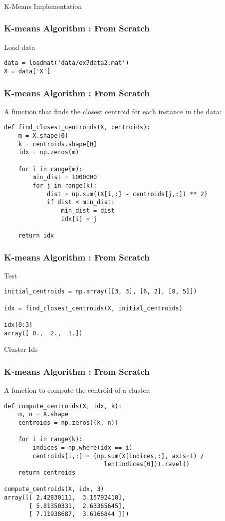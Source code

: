 \begin{frame}[fragile]\frametitle{}
\begin{center}
{\Large K-Means Implementation}
\end{center}
\end{frame}


\begin{frame}[fragile]\frametitle{K-means Algorithm : From Scratch}
Load data
\begin{lstlisting}
data = loadmat('data/ex7data2.mat')
X = data['X']
\end{lstlisting}
\end{frame}

\begin{frame}[fragile]\frametitle{K-means Algorithm : From Scratch}
A function that finds the closest centroid for each instance in the data:
\begin{lstlisting}
def find_closest_centroids(X, centroids):
    m = X.shape[0]
    k = centroids.shape[0]
    idx = np.zeros(m)
    
    for i in range(m):
        min_dist = 1000000
        for j in range(k):
            dist = np.sum((X[i,:] - centroids[j,:]) ** 2)
            if dist < min_dist:
                min_dist = dist
                idx[i] = j
    
    return idx
\end{lstlisting}
\end{frame}

\begin{frame}[fragile]\frametitle{K-means Algorithm : From Scratch}
Test
\begin{lstlisting}
initial_centroids = np.array([[3, 3], [6, 2], [8, 5]])

idx = find_closest_centroids(X, initial_centroids)

idx[0:3]
array([ 0.,  2.,  1.])
\end{lstlisting}
Cluster Ids
\end{frame}


\begin{frame}[fragile]\frametitle{K-means Algorithm : From Scratch}
A function to compute the centroid of a cluster:
\begin{lstlisting}
def compute_centroids(X, idx, k):
    m, n = X.shape
    centroids = np.zeros((k, n))
    
    for i in range(k):
        indices = np.where(idx == i)
        centroids[i,:] = (np.sum(X[indices,:], axis=1) /
        					len(indices[0])).ravel() 
    return centroids
    
compute_centroids(X, idx, 3)
array([[ 2.42830111,  3.15792418],
       [ 5.81350331,  2.63365645],
       [ 7.11938687,  3.6166844 ]])
\end{lstlisting}
\end{frame}

